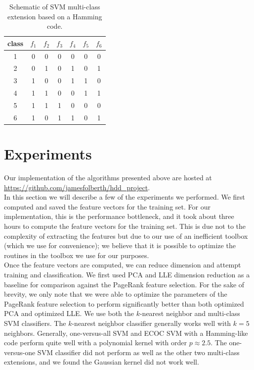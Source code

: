 \documentclass[12pt]{article}
\begin{document}
\begin{table}
   \centering
   \begin{tabular}{|c|cccccc|}
      \hline
      class&$f_{1}$ & $f_{2}$ & $f_{3}$ & $f_{4}$ & $f_{5}$ & $f_{6}$ \\\hline
      1 & 0 & 0 & 0 & 0 & 0 & 0 \\\hline
      2 & 0 & 1 & 0 & 1 & 0 & 1 \\\hline
      3 & 1 & 0 & 0 & 1 & 1 & 0 \\\hline
      4 & 1 & 1 & 0 & 0 & 1 & 1 \\\hline
      5 & 1 & 1 & 1 & 0 & 0 & 0 \\\hline
      6 & 1 & 0 & 1 & 1 & 0 & 1 \\\hline
   \end{tabular}
   \caption{Schematic of SVM multi-class extension based on a Hamming code.}
   \label{tab:ecoc}
\end{table}


\section{Experiments}

Our implementation of the algorithms presented above are hosted at \url{https://github.com/jamesfolberth/hdd_project}.\\

In this section we will describe a few of the experiments we performed.  We first computed and saved the feature vectors for the training set.  For our implementation, this is the performance bottleneck, and it took about three hours to compute the feature vectors for the training set.  This is due not to the complexity of extracting the features but due to our use of an inefficient toolbox (which we use for convenience); we believe that it is possible to optimize the routines in the toolbox we use for our purposes.\\

Once the feature vectors are computed, we can reduce dimension and attempt training and classification.  We first used PCA and LLE dimension reduction as a baseline for comparison against the PageRank feature selection.  For the sake of brevity, we only note that we were able to optimize the parameters of the PageRank feature selection to perform significantly better than both optimized PCA and optimized LLE.  We use both the $k$-nearest neighbor and multi-class SVM classifiers.  The $k$-nearest neighbor classifier generally works well with $k=5$ neighbors.  Generally, one-versus-all SVM and ECOC SVM with a Hamming-like code perform quite well with a polynomial kernel with order $p\approx 2.5$.  The one-versus-one SVM classifier did not perform as well as the other two multi-class extensions, and we found the Gaussian kernel did not work well.\\
\end{document}
